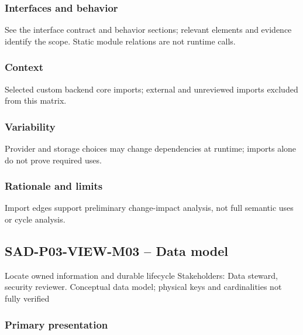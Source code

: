 \documentclass[10pt,letterpaper]{article}
\begin{document}
\subsubsection{Interfaces and behavior}
See the interface contract and behavior sections; relevant elements and evidence identify the scope. Static module relations are not runtime calls.
\subsubsection{Context}
Selected custom backend core imports; external and unreviewed imports excluded from this matrix.
\subsubsection{Variability}
Provider and storage choices may change dependencies at runtime; imports alone do not prove required uses.
\subsubsection{Rationale and limits}
Import edges support preliminary change-impact analysis, not full semantic uses or cycle analysis.
\subsection{SAD-P03-VIEW-M03 -- Data model}
Locate owned information and durable lifecycle Stakeholders: Data steward, security reviewer. Conceptual data model; physical keys and cardinalities not fully verified
\subsubsection{Primary presentation}
\end{document}
